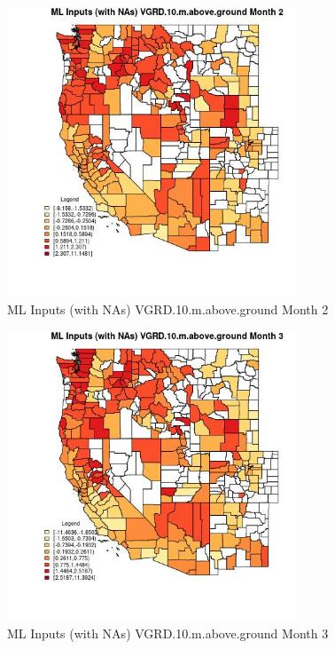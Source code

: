 \begin{figure} 
\centering  
\includegraphics[width=0.77\textwidth]{Code_Outputs/Report_ML_input_PM25_Step4_part_f_de_duplicated_aves_prioritize_24hr_obswNAs_CountyVGRD10mabovegroundmedianMonth2.jpg} 
\caption{\label{fig:Report_ML_input_PM25_Step4_part_f_de_duplicated_aves_prioritize_24hr_obswNAsCountyVGRD10mabovegroundmedianMonth2}ML Inputs (with NAs) VGRD.10.m.above.ground Month 2} 
\end{figure} 
 

\begin{figure} 
\centering  
\includegraphics[width=0.77\textwidth]{Code_Outputs/Report_ML_input_PM25_Step4_part_f_de_duplicated_aves_prioritize_24hr_obswNAs_CountyVGRD10mabovegroundmedianMonth3.jpg} 
\caption{\label{fig:Report_ML_input_PM25_Step4_part_f_de_duplicated_aves_prioritize_24hr_obswNAsCountyVGRD10mabovegroundmedianMonth3}ML Inputs (with NAs) VGRD.10.m.above.ground Month 3} 
\end{figure} 
 

